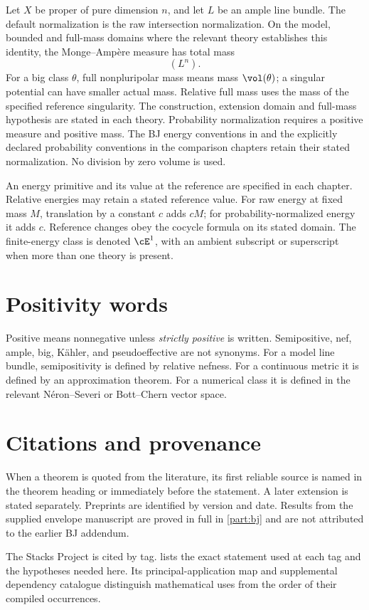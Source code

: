 Let \(X\) be proper of pure dimension \(n\), and let \(L\) be an ample line
bundle. The default normalization is the raw intersection normalization.
On the model, bounded and full-mass domains where the relevant theory
establishes this identity, the Monge--Ampère measure has total mass
\[
  (L^n).
\]
For a big class \(\theta\), full nonpluripolar mass means mass
\(\vol(\theta)\); a singular potential can have smaller actual mass.
Relative full mass uses the mass of the specified reference singularity.
The construction, extension domain and full-mass hypothesis are stated
in each theory. Probability normalization requires a positive measure
and positive mass. The BJ energy conventions in 
and the explicitly declared probability conventions in the comparison
chapters retain their stated normalization. No division by zero volume
is used.

An energy primitive and its value at the reference are specified in each
chapter. Relative energies may retain a stated reference value. For raw
energy at fixed mass \(M\), translation by a constant \(c\) adds \(cM\);
for probability-normalized energy it adds \(c\). Reference changes obey
the cocycle formula on its stated domain. The finite-energy class is
denoted \(\cE^1\), with an ambient subscript or superscript when more than one
theory is present.

\section*{Positivity words}
\label{front:conventions-positivity}

Positive means nonnegative unless \emph{strictly positive} is written.
Semipositive, nef, ample, big, Kähler, and pseudoeffective are not synonyms.
For a model line bundle, semipositivity is defined by relative nefness.  For a
continuous metric it is defined by an approximation theorem.  For a numerical
class it is defined in the relevant Néron--Severi or Bott--Chern vector space.

\section*{Citations and provenance}
\label{front:conventions-provenance}

When a theorem is quoted from the literature, its first reliable source is
named in the theorem heading or immediately before the statement.  A later
extension is stated separately.  Preprints are identified by version and
date.  Results from the supplied envelope manuscript are proved in full in
\cref{part:bj} and are not attributed to the earlier BJ addendum.

The Stacks Project is cited by tag.   lists the exact statement used
at each tag and the hypotheses needed here. Its principal-application map
and supplemental dependency catalogue distinguish mathematical uses from
the order of their compiled occurrences.
